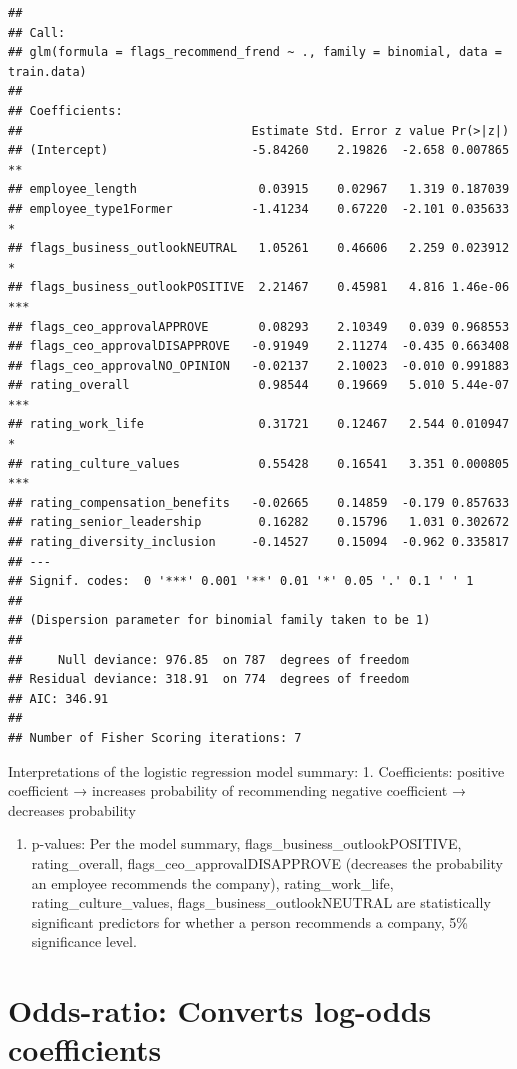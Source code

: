 \documentclass[
]{article}
\providecommand{\tightlist}{%
  \setlength{\itemsep}{0pt}\setlength{\parskip}{0pt}}
\begin{document}
\begin{verbatim}
## 
## Call:
## glm(formula = flags_recommend_frend ~ ., family = binomial, data = train.data)
## 
## Coefficients:
##                                Estimate Std. Error z value Pr(>|z|)    
## (Intercept)                    -5.84260    2.19826  -2.658 0.007865 ** 
## employee_length                 0.03915    0.02967   1.319 0.187039    
## employee_type1Former           -1.41234    0.67220  -2.101 0.035633 *  
## flags_business_outlookNEUTRAL   1.05261    0.46606   2.259 0.023912 *  
## flags_business_outlookPOSITIVE  2.21467    0.45981   4.816 1.46e-06 ***
## flags_ceo_approvalAPPROVE       0.08293    2.10349   0.039 0.968553    
## flags_ceo_approvalDISAPPROVE   -0.91949    2.11274  -0.435 0.663408    
## flags_ceo_approvalNO_OPINION   -0.02137    2.10023  -0.010 0.991883    
## rating_overall                  0.98544    0.19669   5.010 5.44e-07 ***
## rating_work_life                0.31721    0.12467   2.544 0.010947 *  
## rating_culture_values           0.55428    0.16541   3.351 0.000805 ***
## rating_compensation_benefits   -0.02665    0.14859  -0.179 0.857633    
## rating_senior_leadership        0.16282    0.15796   1.031 0.302672    
## rating_diversity_inclusion     -0.14527    0.15094  -0.962 0.335817    
## ---
## Signif. codes:  0 '***' 0.001 '**' 0.01 '*' 0.05 '.' 0.1 ' ' 1
## 
## (Dispersion parameter for binomial family taken to be 1)
## 
##     Null deviance: 976.85  on 787  degrees of freedom
## Residual deviance: 318.91  on 774  degrees of freedom
## AIC: 346.91
## 
## Number of Fisher Scoring iterations: 7
\end{verbatim}

Interpretations of the logistic regression model summary: 1.
Coefficients: positive coefficient → increases probability of
recommending negative coefficient → decreases probability

\begin{enumerate}
\def\labelenumi{\arabic{enumi}.}
\setcounter{enumi}{1}
\tightlist
\item
  p-values: Per the model summary, flags\_business\_outlookPOSITIVE,
  rating\_overall, flags\_ceo\_approvalDISAPPROVE (decreases the
  probability an employee recommends the company), rating\_work\_life,
  rating\_culture\_values, flags\_business\_outlookNEUTRAL are
  statistically significant predictors for whether a person recommends a
  company, 5\% significance level.
\end{enumerate}

\section{Odds-ratio: Converts log-odds
coefficients}\label{odds-ratio-converts-log-odds-coefficients}
\end{document}
